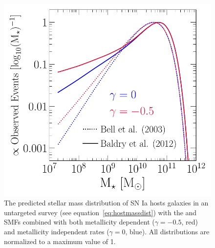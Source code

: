 \documentclass[ms.tex]{subfiles}
\begin{document}
\begin{figure}
\centering
\includegraphics[scale = 0.55]{ia_massdist.pdf}
\caption{
The predicted stellar mass distribution of SN Ia hosts galaxies in an
untargeted survey (see equation~\ref{eq:hostmassdist}) with the
\citet[][dotted]{Bell2003} and~\citet[][solid]{Baldry2012} SMFs combined with
both metallicity dependent ($\gamma = -0.5$, red) and metallicity independent
rates ($\gamma = 0$, blue).
All distributions are normalized to a maximum value of 1.
}
\label{fig:hostmassdist}
\end{figure}
\end{document}
